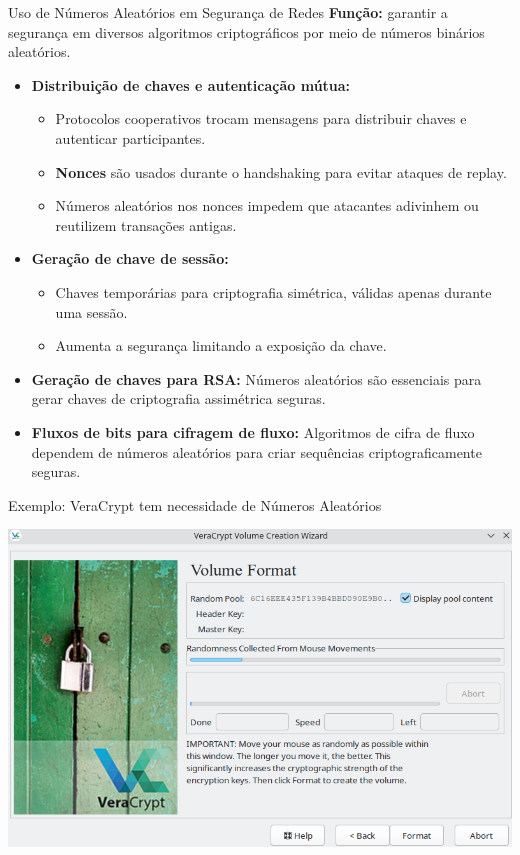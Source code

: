 \begin{frame}{Uso de Números Aleatórios em Segurança de Redes}
\textbf{Função:} garantir a segurança em diversos algoritmos criptográficos por meio de números binários aleatórios.

\medskip
\begin{itemize}
    \item \textbf{Distribuição de chaves e autenticação mútua:}
    \begin{itemize}
        \item Protocolos cooperativos trocam mensagens para distribuir chaves e autenticar participantes.
        \item \textbf{Nonces} são usados durante o handshaking para evitar ataques de replay.
        \item Números aleatórios nos nonces impedem que atacantes adivinhem ou reutilizem transações antigas.
    \end{itemize}
    
    \item \textbf{Geração de chave de sessão:}
    \begin{itemize}
        \item Chaves temporárias para criptografia simétrica, válidas apenas durante uma sessão.
        \item Aumenta a segurança limitando a exposição da chave.
    \end{itemize}

    \item \textbf{Geração de chaves para RSA:}  
    Números aleatórios são essenciais para gerar chaves de criptografia assimétrica seguras.

    \item \textbf{Fluxos de bits para cifragem de fluxo:}  
    Algoritmos de cifra de fluxo dependem de números aleatórios para criar sequências criptograficamente seguras.
\end{itemize}
\end{frame}

\begin{frame}{Exemplo: VeraCrypt 
tem necessidade de Números Aleatórios}

\centering
\includegraphics[width=0.8\linewidth]{Figuras/veracrypt-randomness.png}


\end{frame}


